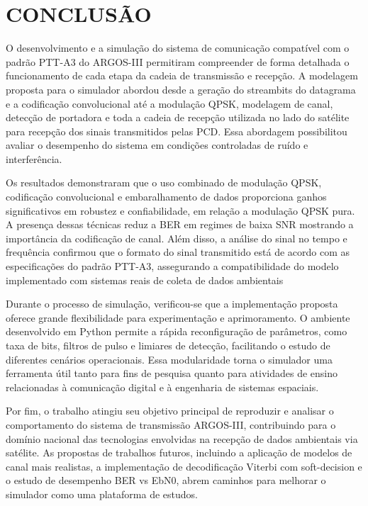 \chapter{CONCLUSÃO}\label{cap:conclusao}

O desenvolvimento e a simulação do sistema de comunicação compatível com o padrão \gls{PTT-A3} do \gls{ARGOS-III} permitiram compreender de forma detalhada o funcionamento de cada etapa da cadeia de transmissão e recepção. A modelagem proposta para o simulador abordou desde a geração do streambits do datagrama e a codificação convolucional até a modulação \gls{QPSK}, modelagem de canal, detecção de portadora e toda a cadeia de recepção utilizada no lado do satélite para recepção dos sinais transmitidos pelas \gls{PCD}. Essa abordagem possibilitou avaliar o desempenho do sistema em condições controladas de ruído e interferência. 

Os resultados demonstraram que o uso combinado de modulação \gls{QPSK}, codificação convolucional e embaralhamento de dados proporciona ganhos significativos em robustez e confiabilidade, em relação a modulação \gls{QPSK} pura. A presença dessas técnicas reduz a \gls{BER} em regimes de baixa \gls{SNR} mostrando a importância da codificação de canal. Além disso, a análise do sinal no tempo e frequência confirmou que o formato do sinal transmitido está de acordo com as especificações do padrão \gls{PTT-A3}, assegurando a compatibilidade do modelo implementado com sistemas reais de coleta de dados ambientais \cite{cnes_services_and_message_formats_ed2_rev2_2006}

Durante o processo de simulação, verificou-se que a implementação proposta oferece grande flexibilidade para experimentação e aprimoramento. O ambiente desenvolvido em Python permite a rápida reconfiguração de parâmetros, como taxa de bits, filtros de pulso e limiares de detecção, facilitando o estudo de diferentes cenários operacionais. Essa modularidade torna o simulador uma ferramenta útil tanto para fins de pesquisa quanto para atividades de ensino relacionadas à comunicação digital e à engenharia de sistemas espaciais.

Por fim, o trabalho atingiu seu objetivo principal de reproduzir e analisar o comportamento do sistema de transmissão \gls{ARGOS-III}, contribuindo para o domínio nacional das tecnologias envolvidas na recepção de dados ambientais via satélite. As propostas de trabalhos futuros, incluindo a aplicação de modelos de canal mais realistas, a implementação de decodificação Viterbi com soft-decision e o estudo de desempenho \gls{BER} vs \gls{EbN0}, abrem caminhos para melhorar o simulador como uma plataforma de estudos.

